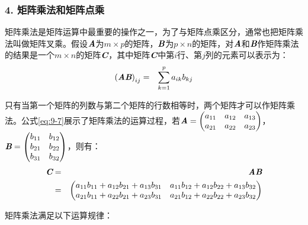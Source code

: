 
\subsubsection{4. 矩阵乘法和矩阵点乘}

\parinterval 矩阵乘法是矩阵运算中最重要的操作之一，为了与矩阵点乘区分，通常也把矩阵乘法叫做矩阵叉乘。假设$ {\textbf{\em A}} $为$ m\times p $的矩阵，$ {\textbf{\em B}} $为$ p\times n $的矩阵，对$ {\textbf{\em A}}$和$ {\textbf{\em B}} $作矩阵乘法的结果是一个$ m\times n $的矩阵$ {\textbf{\em C}} $，其中矩阵$ {\textbf{\em C}} $中第$ i $行、第$ j $列的元素可以表示为：
\begin{eqnarray}
{({\textbf{\em A}}{\textbf{\em B}})}_{ij} &=& \sum_{k=1}^p a_{ik}b_{kj}
\label{eq:9-6}
\end{eqnarray}

\parinterval 只有当第一个矩阵的列数与第二个矩阵的行数相等时，两个矩阵才可以作矩阵乘法。公式\eqref{eq:9-7}展示了矩阵乘法的运算过程，若${\textbf{\em A}}=\begin{pmatrix}a_{11} & a_{12}& a_{13}\\a_{21} & a_{22} & a_{23}\end{pmatrix}$，${\textbf{\em B}}=\begin{pmatrix}b_{11} & b_{12}\\b_{21} & b_{22}\\b_{31} & b_{32}\end{pmatrix} $，则有：
\vspace{-0.5em}
\begin{eqnarray}
{\textbf{\em C}} & = & {\textbf{\em A}}{\textbf{\em B}} \nonumber \\
          & = & \begin{pmatrix}
   a_{11}b_{11}+a_{12}b_{21}+a_{13}b_{31} & a_{11}b_{12}+a_{12}b_{22}+a_{13}b_{32}\\
   a_{21}b_{11}+a_{22}b_{21}+a_{23}b_{31} & a_{21}b_{12}+a_{22}b_{22}+a_{23}b_{32}
\end{pmatrix}
\label{eq:9-7}
\end{eqnarray}

\parinterval 矩阵乘法满足以下运算规律：

